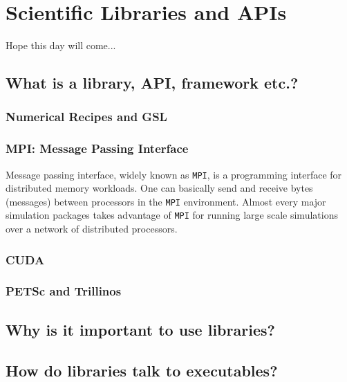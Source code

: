 \chapter{Scientific Libraries and APIs}
Hope this day will come...

\section{What is a library, API, framework etc.?}
\subsection{Numerical Recipes and GSL}
\subsection{MPI: Message Passing Interface}
Message passing interface, widely known as \texttt{MPI}, is a programming interface for distributed 
memory workloads. One can basically send and receive bytes (messages) between processors in the 
\texttt{MPI} environment. Almost every major simulation packages takes advantage of \texttt{MPI}
for running large scale simulations over a network of distributed processors.

\subsection{CUDA}

\subsection{PETSc and Trillinos}

\section{Why is it important to use libraries?}

\section{How do libraries talk to executables?}
